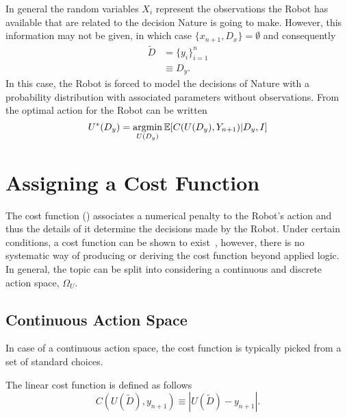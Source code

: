 \begin{example}
	In general the random variables $X_i$ represent the observations the Robot has available that are related to the decision Nature is going to make. However, this information may not be given, in which case $\{x_{n+1},D_x\}=\emptyset$ and consequently
	\begin{equation}
		\begin{split}
			\tilde{D} &=\{y_i\}_{i=1}^n\\
			&\equiv D_y.
		\end{split}
	\end{equation}
	In this case, the Robot is forced to model the decisions of Nature with a probability distribution with associated parameters without observations. From  the optimal action for the Robot can be written
	\begin{equation}
		U^*(D_y) = \operatorname*{argmin}_{U(D_y)} \mathbb{E}[C(U(D_y), Y_{n+1})|D_y,I]
		\label{eq:best_decision1}
	\end{equation}
\end{example}

\section{Assigning a Cost Function}
\label{sec:assing_cost}
The cost function () associates a numerical penalty to the Robot's action and thus the details of it determine the decisions made by the Robot. Under certain conditions, a cost function can be shown to exist~\cite{lavalle2006planning}, however, there is no systematic way of producing or deriving the cost function beyond applied logic. In general, the topic can be split into considering a continuous and discrete action space, $\Omega_U$. 	

\subsection{Continuous Action Space}
In case of a continuous action space, the cost function is typically picked from a set of standard choices.	
\begin{definition}
	\label{def:linear_cost_function}
	The linear cost function is defined as follows
	\begin{equation}
		C(U(\tilde{D}),y_{n+1}) \equiv |U(\tilde{D})-y_{n+1}|.
	\end{equation}	
\end{definition}

